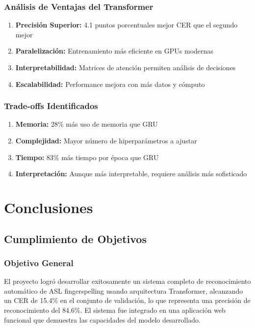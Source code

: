 \documentclass[12pt,a4paper]{article}
\begin{document}
\subsubsection{Análisis de Ventajas del Transformer}
\begin{enumerate}
    \item \textbf{Precisión Superior:} 4.1 puntos porcentuales mejor CER que el segundo mejor
    \item \textbf{Paralelización:} Entrenamiento más eficiente en GPUs modernas  
    \item \textbf{Interpretabilidad:} Matrices de atención permiten análisis de decisiones
    \item \textbf{Escalabilidad:} Performance mejora con más datos y cómputo
\end{enumerate}

\subsubsection{Trade-offs Identificados}
\begin{enumerate}
    \item \textbf{Memoria:} 28\% más uso de memoria que GRU
    \item \textbf{Complejidad:} Mayor número de hiperparámetros a ajustar
    \item \textbf{Tiempo:} 83\% más tiempo por época que GRU
    \item \textbf{Interpretación:} Aunque más interpretable, requiere análisis más sofisticado
\end{enumerate}

\section{Conclusiones}

\subsection{Cumplimiento de Objetivos}

\subsubsection{Objetivo General}
El proyecto logró desarrollar exitosamente un sistema completo de reconocimiento automático de ASL fingerspelling usando arquitectura Transformer, alcanzando un CER de 15.4\% en el conjunto de validación, lo que representa una precisión de reconocimiento del 84.6\%. El sistema fue integrado en una aplicación web funcional que demuestra las capacidades del modelo desarrollado.
\end{document}
